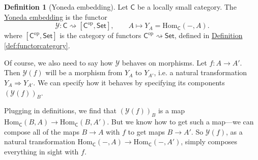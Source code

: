 \documentclass[a4paper,10pt]{scrreprt}
\newcommand{\defn}[1]{\ul{#1}}
\newcommand{\Hom}{\mathrm{Hom}}
\theoremstyle{definition}
\newtheorem{definition}{Definition}[section]
\theoremstyle{plain}
\theoremstyle{remark}
\begin{document}
\begin{definition}[Yoneda embedding]
  \label{def:yonedaembedding}
  Let $\mathsf{C}$ be a locally small category. The \defn{Yoneda embedding} is the functor
  \begin{equation*}
    \mathcal{Y}\colon \mathsf{C} \rightsquigarrow [\mathsf{C}^{\mathrm{op}}, \mathsf{Set}], \qquad A \mapsto Y_{A} = \Hom_{\mathsf{C}}(-, A).
  \end{equation*}
  where $[\mathsf{C}^{\mathrm{op}}, \mathsf{Set}]$ is the category of functors $\mathsf{C}^{\mathrm{op}} \rightsquigarrow \mathsf{Set}$, defined in \hyperref[def:functorcategory]{Definition \ref*{def:functorcategory}}.

  Of course, we also need to say how $\mathcal{Y}$ behaves on morphisms. Let $f\colon A \to A'$. Then $\mathcal{Y}(f)$ will be a morphism from $Y_{A}$ to $Y_{A'}$, i.e. a natural transformation $Y_{A} \Rightarrow Y_{A'}$. We can specify how it behaves by specifying its components $(\mathcal{Y}(f))_{B}$. 

  Plugging in definitions, we find that $(\mathcal{Y}(f))_{B}$ is a map $\Hom_{\mathsf{C}}(B, A) \to \Hom_{\mathsf{C}}(B, A')$. But we know how to get such a map---we can compose all of the maps $B \to A$ with $f$ to get maps $B \to A'$. So $\mathcal{Y}(f)$, as a natural transformation $\Hom_{\mathsf{C}}(-, A) \to \Hom_{\mathsf{C}}(-, A')$, simply composes everything in sight with $f$.
\end{definition}
\end{document}
